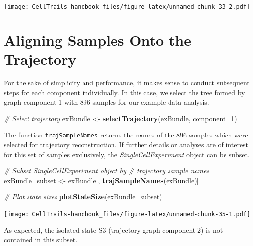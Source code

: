 \documentclass[]{book}
\newenvironment{Shaded}{\begin{snugshade}}{\end{snugshade}}
\newcommand{\KeywordTok}[1]{\textcolor[rgb]{0.13,0.29,0.53}{\textbf{#1}}}
\newcommand{\DataTypeTok}[1]{\textcolor[rgb]{0.13,0.29,0.53}{#1}}
\newcommand{\DecValTok}[1]{\textcolor[rgb]{0.00,0.00,0.81}{#1}}
\newcommand{\StringTok}[1]{\textcolor[rgb]{0.31,0.60,0.02}{#1}}
\newcommand{\CommentTok}[1]{\textcolor[rgb]{0.56,0.35,0.01}{\textit{#1}}}
\newcommand{\NormalTok}[1]{#1}
\theoremstyle{definition}
\theoremstyle{definition}
\theoremstyle{definition}
\theoremstyle{remark}
\begin{document}
\texttt{[image: CellTrails-handbook\_files/figure-latex/unnamed-chunk-33-2.pdf]}

\section{Aligning Samples Onto the
Trajectory}\label{aligning-samples-onto-the-trajectory}

For the sake of simplicity and performance, it makes sense to conduct
subsequent steps for each component individually. In this case, we
select the tree formed by graph component 1 with 896 samples for our
example data analysis.

\begin{Shaded}
\begin{Highlighting}[]
\CommentTok{# Select trajectory}
\NormalTok{exBundle <-}\StringTok{ }\KeywordTok{selectTrajectory}\NormalTok{(exBundle, }\DataTypeTok{component=}\DecValTok{1}\NormalTok{)}
\end{Highlighting}
\end{Shaded}

The function \texttt{trajSampleNames} returns the names of the 896
samples which were selected for trajectory reconstruction. If further
details or analyses are of interest for this set of samples exclusively,
the
\emph{\href{http://bioconductor.org/packages/SingleCellExperiment}{SingleCellExperiment}}
object can be subset.

\begin{Shaded}
\begin{Highlighting}[]
\CommentTok{# Subset SingleCellExperiment object by}
\CommentTok{# trajectory sample names}
\NormalTok{exBundle_subset <-}\StringTok{ }\NormalTok{exBundle[, }\KeywordTok{trajSampleNames}\NormalTok{(exBundle)]}

\CommentTok{# Plot state sizes}
\KeywordTok{plotStateSize}\NormalTok{(exBundle_subset)}
\end{Highlighting}
\end{Shaded}

\texttt{[image: CellTrails-handbook\_files/figure-latex/unnamed-chunk-35-1.pdf]}

As expected, the isolated state S3 (trajectory graph component 2) is not
contained in this subset.
\end{document}
